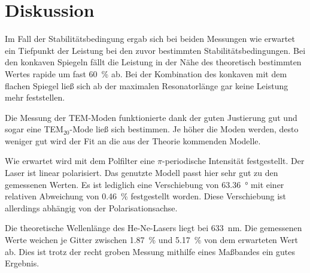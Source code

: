 \section{Diskussion}
\label{sec:Diskussion}

Im Fall der Stabilitätsbedingung ergab sich bei beiden Messungen wie erwartet ein Tiefpunkt der Leistung bei den zuvor bestimmten Stabilitätsbedingungen. 
Bei den konkaven Spiegeln fällt die Leistung in der Nähe des theoretisch bestimmten Wertes rapide um fast \SI{60}{\percent} ab.
Bei der Kombination des konkaven mit dem flachen Spiegel ließ sich ab der maximalen Resonatorlänge gar keine Leistung mehr feststellen. 

Die Messung der TEM-Moden funktionierte dank der guten Justierung gut und sogar eine TEM$_{20}$-Mode ließ sich bestimmen. 
Je höher die Moden werden, desto weniger gut wird der Fit an die aus der Theorie kommenden Modelle.

Wie erwartet wird mit dem Polfilter eine $\pi$-periodische Intensität festgestellt. Der Laser ist linear polarisiert. Das genutzte Modell passt hier sehr gut zu den gemessenen Werten. 
Es ist lediglich eine Verschiebung von \SI{63.36}{\degree} mit einer relativen Abweichung von \SI{0.46}{\percent} festgestellt worden. Diese Verschiebung ist allerdings abhängig von der Polarisationsachse. %

Die theoretische Wellenlänge des He-Ne-Lasers liegt bei \SI{633}{\nano\meter}. Die gemessenen Werte weichen je Gitter zwischen \SI{1.87}{\percent} und \SI{5.17}{\percent} von dem erwarteten Wert ab. Dies ist trotz der recht groben Messung mithilfe eines Maßbandes ein gutes Ergebnis.